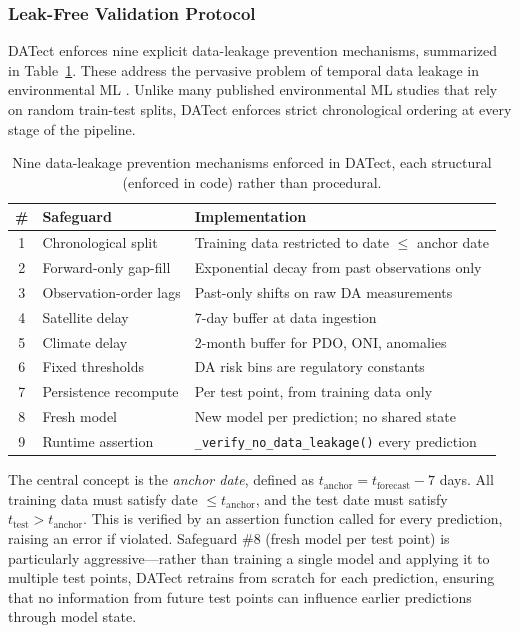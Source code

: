 \documentclass[toxins,article,submit,moreauthors]{Definitions/mdpi}
\begin{document}
\subsubsection{Leak-Free Validation Protocol}

DATect enforces nine explicit data-leakage prevention mechanisms, summarized in Table~\ref{tab:leakage-safeguards}. These address the pervasive problem of temporal data leakage in environmental ML \cite{Kapoor2023, Roberts2017}. Unlike many published environmental ML studies that rely on random train-test splits, DATect enforces strict chronological ordering at every stage of the pipeline.

\begin{table}[H]
\caption{Nine data-leakage prevention mechanisms enforced in DATect, each structural (enforced in code) rather than procedural.}
\label{tab:leakage-safeguards}
\centering\footnotesize
\begin{tabularx}{\linewidth}{clX}
\toprule
\textbf{\#} & \textbf{Safeguard} & \textbf{Implementation} \\
\midrule
1 & Chronological split & Training data restricted to date $\leq$ anchor date \\
2 & Forward-only gap-fill & Exponential decay from past observations only \\
3 & Observation-order lags & Past-only shifts on raw DA measurements \\
4 & Satellite delay & 7-day buffer at data ingestion \\
5 & Climate delay & 2-month buffer for PDO, ONI, anomalies \\
6 & Fixed thresholds & DA risk bins are regulatory constants \\
7 & Persistence recompute & Per test point, from training data only \\
8 & Fresh model & New model per prediction; no shared state \\
9 & Runtime assertion & \texttt{\_verify\_no\_data\_leakage()} every prediction \\
\bottomrule
\end{tabularx}
\end{table}

The central concept is the \textit{anchor date}, defined as $t_{\text{anchor}} = t_{\text{forecast}} - 7$ days. All training data must satisfy date $\leq t_{\text{anchor}}$, and the test date must satisfy $t_{\text{test}} > t_{\text{anchor}}$. This is verified by an assertion function called for every prediction, raising an error if violated. Safeguard \#8 (fresh model per test point) is particularly aggressive---rather than training a single model and applying it to multiple test points, DATect retrains from scratch for each prediction, ensuring that no information from future test points can influence earlier predictions through model state.
\end{document}
